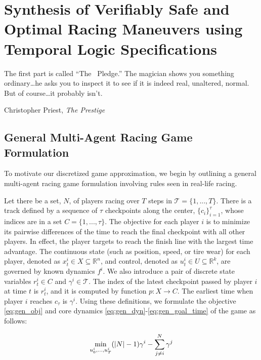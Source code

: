 \chapter{Synthesis of Verifiably Safe and Optimal Racing Maneuvers using Temporal Logic Specifications}
\epigraph{\flushright The first part is called ``The~ Pledge.'' The magician shows you something ordinary\ldots he asks you to inspect it to see if it is indeed real, unaltered, normal. But of course\ldots it probably isn't.}{Christopher Priest, \textit{The Prestige}}
\label{chapter:synthesis}
\section{General Multi-Agent Racing Game Formulation} \label{section:genform}
To motivate our discretized game approximation, we begin by outlining a general multi-agent racing game formulation involving rules seen in real-life racing. 

Let there be a set, $N$, of players racing over $T$ steps in $\mathcal{T} = \{1, ..., T\}$. There is a track defined by a sequence of $\tau$ checkpoints along the center, $\{c_i\}_{i=1}^{\tau}$, whose indices are in a set $C=\{1,..., \tau\}$. The objective for each player $i$ is to minimize its pairwise differences of the time to reach the final checkpoint with all other players. In effect, the player targets to reach the finish line with the largest time advantage. The continuous state (such as position, speed, or tire wear) for each player, denoted as $x^i_t \in X \subseteq \mathbb{R}^n$, and control, denoted as $u^i_t \in U \subseteq \mathbb{R}^k$, are governed by known dynamics $f^i$. We also introduce a pair of discrete state variables $r^i_t \in C$ and $\gamma^i \in \mathcal{T}$. The index of the latest checkpoint passed by player $i$ at time $t$ is $r^i_t$, and it is computed by function $p: X\rightarrow C$. The earliest time when player $i$ reaches $c_\tau$ is $\gamma^i$. Using these definitions, we formulate the objective \eqref{eq:gen_obj} and core dynamics \eqref{eq:gen_dyn}-\eqref{eq:gen_goal_time} of the game as follows:

\begin{equation} \label{eq:gen_obj}
    \min_{u^i_0, ..., u^i_T} (|N|-1)\gamma^i - \sum^N_{j \neq i}\gamma^j \\
\end{equation}

